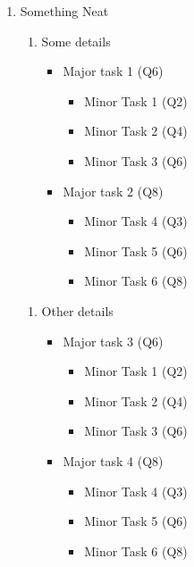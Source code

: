 \begin{enumerate}
    \item Something Neat
        \begin{enumerate}
            \item Some details
                \begin{itemize}
                    \item Major task 1 (Q6)
                        \begin{itemize}
                            \item Minor Task 1 (Q2)
                            \item Minor Task 2 (Q4)
                            \item Minor Task 3 (Q6)
                        \end{itemize}
                    \item Major task 2 (Q8)
                        \begin{itemize}
                            \item Minor Task 4 (Q3)
                            \item Minor Task 5 (Q6)
                            \item Minor Task 6 (Q8)
                        \end{itemize}
                \end{itemize}
        \end{enumerate}
        \begin{enumerate}
            \item Other details
                \begin{itemize}
                    \item Major task 3 (Q6)
                        \begin{itemize}
                            \item Minor Task 1 (Q2)
                            \item Minor Task 2 (Q4)
                            \item Minor Task 3 (Q6)
                        \end{itemize}
                    \item Major task 4 (Q8)
                        \begin{itemize}
                            \item Minor Task 4 (Q3)
                            \item Minor Task 5 (Q6)
                            \item Minor Task 6 (Q8)
                        \end{itemize}
                \end{itemize}
        \end{enumerate}


\end{enumerate}
